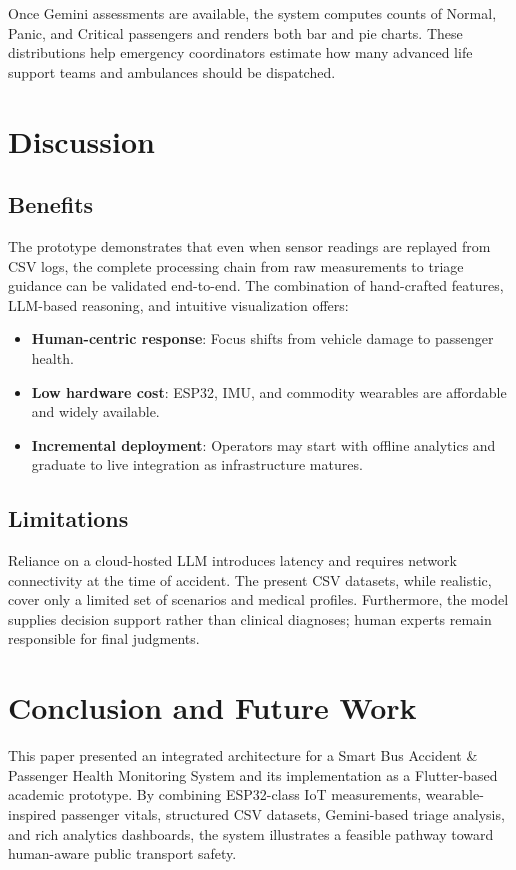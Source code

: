 \documentclass[conference]{IEEEtran}
\begin{document}
Once Gemini assessments are available, the system computes counts of Normal, Panic, and Critical passengers and renders both bar and pie charts.
These distributions help emergency coordinators estimate how many advanced life support teams and ambulances should be dispatched.

\section{Discussion}

\subsection{Benefits}

The prototype demonstrates that even when sensor readings are replayed from CSV logs, the complete processing chain from raw measurements to triage guidance can be validated end-to-end.
The combination of hand-crafted features, LLM-based reasoning, and intuitive visualization offers:

\begin{itemize}
    \item \textbf{Human-centric response}: Focus shifts from vehicle damage to passenger health.
    \item \textbf{Low hardware cost}: ESP32, IMU, and commodity wearables are affordable and widely available.
    \item \textbf{Incremental deployment}: Operators may start with offline analytics and graduate to live integration as infrastructure matures.
\end{itemize}

\subsection{Limitations}

Reliance on a cloud-hosted LLM introduces latency and requires network connectivity at the time of accident.
The present CSV datasets, while realistic, cover only a limited set of scenarios and medical profiles.
Furthermore, the model supplies decision support rather than clinical diagnoses; human experts remain responsible for final judgments.

\section{Conclusion and Future Work}

This paper presented an integrated architecture for a Smart Bus Accident \& Passenger Health Monitoring System and its implementation as a Flutter-based academic prototype.
By combining ESP32-class IoT measurements, wearable-inspired passenger vitals, structured CSV datasets, Gemini-based triage analysis, and rich analytics dashboards, the system illustrates a feasible pathway toward human-aware public transport safety.
\end{document}
